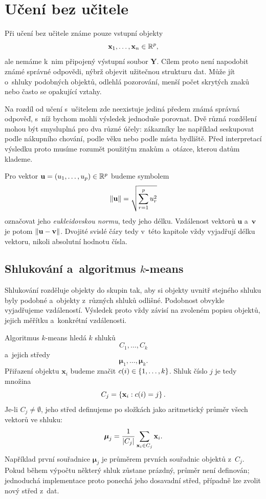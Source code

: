 \section{Učení bez učitele}\label{sec:ai-unsupervised}

Při učení bez učitele známe pouze vstupní objekty
\[
    \mathbf{x}_1,\ldots,\mathbf{x}_n\in\mathbb{R}^p,
\]
ale nemáme k~nim připojený výstupní soubor \(\mathbf{Y}\). Cílem proto není napodobit známé správné odpovědi, nýbrž objevit užitečnou strukturu dat. Může jít o~shluky podobných objektů, odlehlá pozorování, menší počet skrytých znaků nebo často se opakující vztahy.

Na rozdíl od učení s~učitelem zde neexistuje jediná předem známá správná odpověď, s~níž bychom mohli výsledek jednoduše porovnat. Dvě různá rozdělení mohou být smysluplná pro dva různé účely: zákazníky lze například seskupovat podle nákupního chování, podle věku nebo podle místa bydliště. Před interpretací výsledku proto musíme rozumět použitým znakům a~otázce, kterou datům klademe.

\begin{symboldef}
    Pro vektor \(\mathbf{u}=(u_1,\ldots,u_p)\in\mathbb{R}^p\) budeme symbolem
    \[
        \left\lVert\mathbf{u}\right\rVert
        =
        \sqrt{\sum_{r=1}^{p}u_r^2}
    \]
    označovat jeho \emph{eukleidovskou normu}, tedy jeho délku. Vzdálenost vektorů \(\mathbf{u}\) a~\(\mathbf{v}\) je potom \(\left\lVert\mathbf{u}-\mathbf{v}\right\rVert\). Dvojité svislé čáry tedy v~této kapitole vždy vyjadřují délku vektoru, nikoli absolutní hodnotu čísla.
\end{symboldef}

\subsection{Shlukování a~algoritmus \(k\)-means}

Shlukování rozděluje objekty do skupin tak, aby si objekty uvnitř stejného shluku byly podobné a~objekty z~různých shluků odlišné. Podobnost obvykle vyjadřujeme vzdáleností. Výsledek proto vždy závisí na zvoleném popisu objektů, jejich měřítku a~konkrétní vzdálenosti.

Algoritmus \(k\)-means hledá \(k\) shluků
\[
    C_1,\ldots,C_k
\]
a~jejich středy
\[
    \boldsymbol{\mu}_1,\ldots,\boldsymbol{\mu}_k.
\]
Přiřazení objektu \(\mathbf{x}_i\) budeme značit \(c(i)\in\left\{1,\ldots,k\right\}\). Shluk číslo \(j\) je tedy množina
\[
    C_j
    =
    \left\{\mathbf{x}_i:c(i)=j\right\}.
\]
Je-li \(C_j\neq\emptyset\), jeho střed definujeme po složkách jako aritmetický průměr všech vektorů ve shluku:
\[
    \boldsymbol{\mu}_j
    =
    \frac{1}{\left| C_j \right|}
    \sum_{\mathbf{x}_i\in C_j}\mathbf{x}_i.
\]
Například první souřadnice \(\boldsymbol{\mu}_j\) je průměrem prvních souřadnic objektů z~\(C_j\). Pokud během výpočtu některý shluk zůstane prázdný, průměr není definován; jednoduchá implementace proto ponechá jeho dosavadní střed, případně lze zvolit nový střed z~dat.

